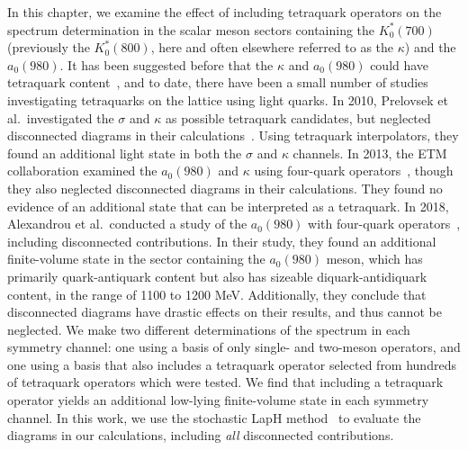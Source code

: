 In this chapter, we examine the effect of including tetraquark operators on the spectrum determination in the scalar meson sectors containing the $K_0^*(700)$ (previously the $K_0^*(800)$, here and often elsewhere referred to as the $\kappa$) and the $a_0(980)$. It has been suggested before that the $\kappa$ and $a_0(980)$ could have tetraquark content~\cite{Jaffe:2004ph, Amsler:2004ps, Close:2002zu, Maiani:2004uc}, and to date, there have been a small number of studies investigating tetraquarks on the lattice using light quarks. In 2010, Prelovsek et al.\ investigated the $\sigma$ and $\kappa$ as possible tetraquark candidates, but neglected disconnected diagrams in their calculations~\cite{Prelovsek:2010kg}. Using tetraquark interpolators, they found an additional light state in both the $\sigma$ and $\kappa$ channels. In 2013, the ETM collaboration examined the $a_0(980)$ and $\kappa$ using four-quark operators~\cite{Alexandrou:2012rm}, though they also neglected disconnected diagrams in their calculations. They found no evidence of an additional state that can be interpreted as a tetraquark. In 2018, Alexandrou et al.\ conducted a study of the $a_0(980)$ with four-quark operators~\cite{Alexandrou:2017itd}, including disconnected contributions. In their study, they found an additional finite-volume state in the sector containing the $a_0(980)$ meson, which has primarily quark-antiquark content but also has sizeable diquark-antidiquark content, in the range of 1100 to 1200 MeV. Additionally, they conclude that disconnected diagrams have drastic effects on their results, and thus cannot be neglected. We make two different determinations of the spectrum in each symmetry channel: one using a basis of only single- and two-meson operators, and one using a basis that also includes a tetraquark operator selected from hundreds of tetraquark operators which were tested. We find that including a tetraquark operator yields an additional low-lying finite-volume state in each symmetry channel. In this work, we use the stochastic LapH method~\cite{Morningstar:2011ka} to evaluate the diagrams in our calculations, including \textit{all} disconnected contributions.
